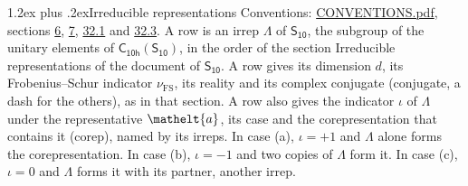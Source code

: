 \documentclass[10pt,a4paper]{article}
\makeatletter
\renewcommand\section{\@startsection{section}{1}{\z@}{-3ex plus -1ex minus -.2ex}%
  {1.2ex plus .2ex}{\normalfont\large\sffamily\bfseries\color{parttitle}}}
\numberwithin{equation}{section}
\newcommand{\eltfont}[1]{{\let\sigma\eltsigma\mathelt{#1}}}
\newcommand{\grp}[1]{\mathsf{#1}}
\newcommand{\elt}[1]{\eltfont{#1}}
\newcommand{\fsind}{\nu_{\mathrm{FS}}}
\makeatother
\begin{document}
\section{Irreducible representations}\label{s:irreps}
Conventions: \href{../../CONVENTIONS.pdf}{CONVENTIONS.pdf}, sections \href{../../../rotation/CONVENTIONS.pdf\#conv.6}{6}, \href{../../../rotation/CONVENTIONS.pdf\#conv.7}{7}, \href{../../CONVENTIONS.pdf\#conv.32.1}{32.1} and \href{../../CONVENTIONS.pdf\#conv.32.3}{32.3}.
\leavevmode\label{n:irrep.Delta}A row is an irrep $\Lambda$ of $\grp{S_{10}}$, the subgroup of the unitary elements of $\grp{C_{10h}}(\grp{S_{10}})$, in the order of the section Irreducible representations of the document of \href{../../../rotation/data/pdf/S10.pdf}{$\grp{S_{10}}$}. \label{n:index.dimension}\label{n:index.frobenius}\label{n:head.irrep}\label{n:head.reality}\label{n:head.conjugate}A row gives its dimension $d$, its Frobenius--Schur indicator $\fsind$, its reality and its complex conjugate (conjugate, a dash for the others), as in that section. \label{n:head.case.corep}\label{n:head.corep}A row also gives the indicator $\iota$ of $\Lambda$ under the representative $\elt{a}$, its case and the corepresentation that contains it (corep), named by its irreps. In case (a), $\iota = +1$ and $\Lambda$ alone forms the corepresentation. In case (b), $\iota = -1$ and two copies of $\Lambda$ form it. In case (c), $\iota = 0$ and $\Lambda$ forms it with its partner, another irrep.
\setlength{\emergencystretch}{2em}\par\setlength{\emergencystretch}{0pt}
\end{document}
